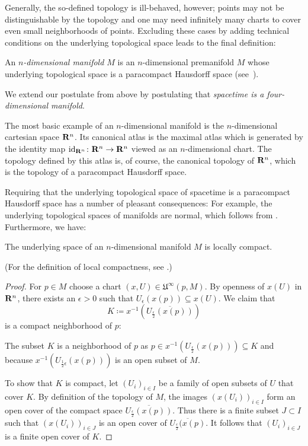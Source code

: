 Generally, the so-defined topology is ill-behaved, however;
points may not be distinguishable by the topology and one may need infinitely
many charts to cover even small neighborhoods of points. Excluding these cases
by adding technical conditions on the underlying topological space leads to the
final definition:
\begin{dfn}
  An \emph{$n$-dimensional manifold $M$} is an $n$-dimensional premanifold $M$
  whose underlying topological space is a paracompact Hausdorff space
  (see~).
\end{dfn}
We extend our postulate from above by postulating that \emph{spacetime is a
four-dimensional manifold}.

The most basic example of an $n$-dimensional manifold is the $n$-dimensional 
cartesian space $\mathbf{R}^n$. Its canonical atlas is the maximal atlas which is generated
by the identity map $\mathrm{id}_{\mathbf{R}^n}\colon \mathbf{R}^n \to \mathbf{R}^n$ viewed
as an $n$-dimensional chart. The topology defined by this atlas is, of course,
the canonical topology of $\mathbf{R}^n$, which is the topology of a paracompact
Hausdorff space.

Requiring that the underlying topological space of spacetime is a paracompact
Hausdorff space has a number of pleasant consequences: For example, the underlying
topological spaces of manifolds are normal, which follows from .
Furthermore, we have:
\begin{prop}
  The underlying space of an $n$-dimensional manifold $M$ is locally compact.
\end{prop}
(For the definition of local compactness, see .)

\begin{proof}
  For $p \in M$ choose a chart $(x, U) \in \mathfrak U^\infty(p, M)$. By openness
  of $x(U)$ in $\mathbf{R}^n$, there exists an $\epsilon > 0$ such that $U_\epsilon(x(p))
  \subseteq x(U)$. We claim that
  \[
    K \coloneqq x^{-1}(\overline{U_{\frac \epsilon 2}(x(p))})
  \]
  is a compact neighborhood of $p$:
  
  The subset $K$ is a neighborhood of $p$ as
  $p \in x^{-1}(U_{\frac \epsilon 2}(x(p))) \subseteq K$ and
  because $x^{-1}(U_{\frac 1 2 \epsilon}(x(p)))$ is an open subset of $M$.

  To show that $K$ is compact, let $(U_i)_{i \in I}$ be a family of open subsets
  of $U$ that cover $K$. By definition of the topology of $M$, the images $(x(U_i))_{i \in I}$
  form an open cover of the compact space $\overline{U_{\frac \epsilon 2}(x(p))}$.
  Thus there is a finite subset $J \subset I$ such that $(x(U_i))_{i \in J}$ is
  an open cover of $\overline{U_{\frac \epsilon 2}(x(p)}$. It follows that
  $(U_i)_{i \in J}$ is a finite open cover of $K$.
\end{proof}

